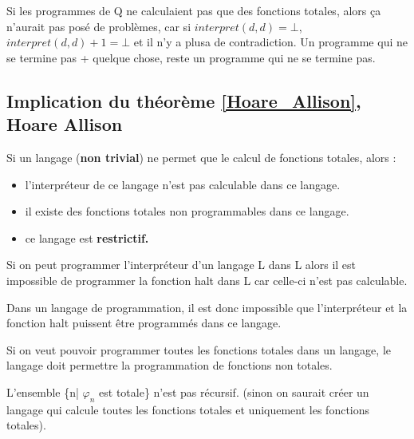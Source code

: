 \begin{myrem}
	Si les programmes de Q ne calculaient pas que des fonctions totales, alors ça n'aurait pas posé de problèmes, car si $interpret(d,d)=\bot$, $interpret(d,d)+1=\bot$ et il n'y a plusa de contradiction.  Un programme qui ne se termine pas + quelque chose, reste un programme qui ne se termine pas.
\end{myrem}

\subsection[Implication du théorème de Hoare Allison]{Implication du théorème \ref{Hoare_Allison}, Hoare Allison}
\begin{myprop}
	Si un langage (\textbf{non trivial}) ne permet que le calcul de fonctions totales, alors :
	\begin{itemize}
		\item l'interpréteur de ce langage n'est pas calculable dans ce langage.
		\item il existe des fonctions totales non programmables dans ce langage.
		\item ce langage est \bf{restrictif}.
	\end{itemize}
\end{myprop}

\begin{myprop}
	Si on peut programmer l'interpréteur d'un langage L dans L alors il est
	impossible de programmer la fonction halt dans L car celle-ci n'est pas calculable.
\end{myprop}

\begin{myprop}
	Dans un langage de programmation, il est donc impossible que
	l'interpréteur et la fonction halt puissent être programmés dans ce langage.
\end{myprop}

\begin{myprop}
	Si on veut pouvoir programmer toutes les fonctions totales dans un langage, le langage doit permettre la programmation de fonctions non totales.
\end{myprop}

\begin{myprop}
	L'ensemble \{n| $\varphi_n$ est totale\} n'est pas récursif.
    (sinon on saurait créer un langage qui calcule toutes les fonctions totales et uniquement les fonctions totales).
\end{myprop}

